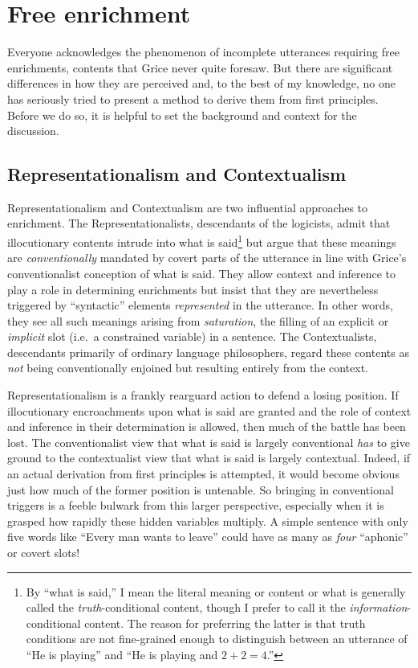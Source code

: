 \chapter{Free enrichment} \label{ch:free enrichment}

Everyone acknowledges the phenomenon of incomplete utterances requiring free enrichments, contents that Grice never quite foresaw. But there are significant differences in how they are perceived and, to the best of my knowledge, no one has seriously tried to present a method to derive them from first principles. Before we do so, it is helpful to set the background and context for the discussion.


\section{Representationalism and Contextualism}

Representationalism and Contextualism are two influential approaches to enrichment. The Representationalists, descendants of the logicists, admit that illocutionary contents intrude into what is said\footnote{By ``what is said,'' I mean the literal meaning or content or what is generally called the \emph{truth}-conditional content, though I prefer to call it the \emph{information}-conditional content. The reason for preferring the latter is that truth conditions are not fine-grained enough to distinguish between an utterance of ``He is playing'' and ``He is playing and $2 + 2 = 4$.''} but argue that these meanings are \emph{conventionally} mandated by covert parts of the utterance in line with Grice's conventionalist conception of what is said. They allow context and inference to play a role in determining enrichments but insist that they are nevertheless triggered by ``syntactic'' elements \emph{represented} in the utterance. In other words, they see all such meanings arising from \emph{saturation}, the filling of an explicit or \emph{implicit} slot (i.e.\ a constrained variable) in a sentence. The Contextualists, descendants primarily of ordinary language philosophers, regard these contents as \emph{not} being conventionally enjoined but resulting entirely from the context.

Representationalism is a frankly rearguard action to defend a losing position. If illocutionary encroachments upon what is said are granted and the role of context and inference in their determination is allowed, then much of the battle has been lost. The conventionalist view that what is said is largely conventional \emph{has} to give ground to the contextualist view that what is said is largely contextual. Indeed, if an actual derivation from first principles is attempted, it would become obvious just how much of the former position is untenable. So bringing in conventional triggers is a feeble bulwark from this larger perspective, especially when it is grasped how rapidly these hidden variables multiply. A simple sentence with only five words like ``Every man wants to leave'' could have as many as \emph{four} ``aphonic'' or covert slots!

